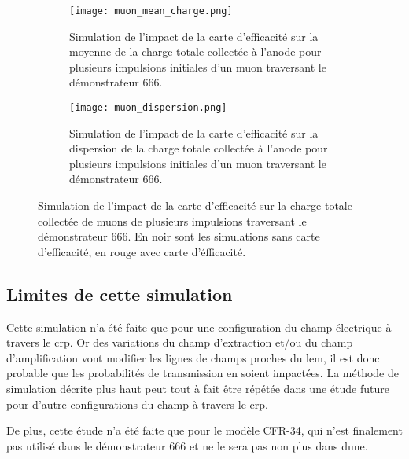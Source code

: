             \begin{figure}[htbp]
                \begin{subfigure}[t]{0.48\textwidth}
                    \texttt{[image: muon\_mean\_charge.png]}
                    \caption{Simulation de l'impact de la carte d'efficacité sur la moyenne de la charge totale collectée à l'anode pour plusieurs impulsions initiales d'un muon traversant le démonstrateur 666.}
                    \label{fig::muon_mean_charge}
                \end{subfigure}
                \hfill
                \begin{subfigure}[t]{0.48\textwidth}
                    \texttt{[image: muon\_dispersion.png]}
                    \caption{Simulation de l'impact de la carte d'efficacité sur la dispersion de la charge totale collectée à l'anode pour plusieurs impulsions initiales d'un muon traversant le démonstrateur 666.}
                    \label{fig::muon_dispersion_charge}
                \end{subfigure}
                \caption[Simulation de l'impact de la carte d'efficacité sur la charge totale collectée de muons de plusieurs impulsions.]{Simulation de l'impact de la carte d'efficacité sur la charge totale collectée de muons de plusieurs impulsions traversant le démonstrateur 666. En noir sont les simulations sans carte d'efficacité, en rouge avec carte d'éfficacité.}
            \end{figure}
        
        \subsection{Limites de cette simulation}
        
            Cette simulation n'a été faite que pour une configuration du champ électrique à travers le \gls{crp}. Or des variations du champ d'extraction et/ou du champ d'amplification vont modifier les lignes de champs proches du \gls{lem}, il est donc probable que les probabilités de transmission en soient impactées. La méthode de simulation décrite plus haut peut tout à fait être répétée dans une étude future pour d'autre configurations du champ à travers le \gls{crp}.
            
            De plus, cette étude n'a été faite que pour le modèle CFR-34, qui n'est finalement pas utilisé dans le démonstrateur 666 et ne le sera pas non plus dans \gls{dune}.
            
